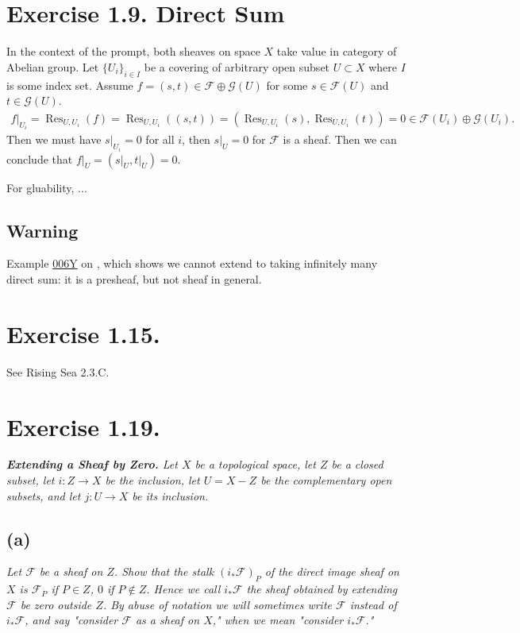 \section{Exercise 1.9. Direct Sum}\label{Hart Ex 1.9.}

In the context of the prompt, both sheaves on space $X$ take value in category of Abelian group. Let $\{U_i\}_{i\in I}$ be a covering of arbitrary open subset $U\subset X$ where $I$ is some index set. Assume $f=(s,t)\in \mathscr F\oplus\mathscr G(U)$ for some $s\in\mathscr F(U)$ and $t\in\mathscr G(U)$. 
\begin{align*}
    f\vert_{U_i}=\operatorname{Res}_{U,U_i}(f)=\operatorname{Res}_{U,U_i}((s,t))=(\operatorname{Res}_{U,U_i}(s),\operatorname{Res}_{U,U_i}(t))=0\in \mathscr F(U_i)\oplus\mathscr G(U_i).
\end{align*}
Then we must have $s\vert_{U_i}=0$ for all $i$, then $s\vert_U=0$ for $\mathscr F$ is a sheaf. Then we can conclude that $f\vert_{U}=(s\vert_U,t\vert_U)=0$.

For gluability, ...

\subsection{Warning}

Example \href{https://stacks.math.columbia.edu/tag/006Y}{006Y} on \cite{stacks-project}, which shows we cannot extend to taking infinitely many direct sum: it is a presheaf, but not sheaf in general. 

\section{Exercise 1.15.}

See Rising Sea 2.3.C.

\section{Exercise 1.19.}\label{Hart Chap 2 Ex 1.19.}

\textit{\textbf{Extending a Sheaf by Zero.} Let $X$ be a topological space, let $Z$ be a closed subset, let $i:Z\to X$ be the inclusion, let $U=X-Z$ be the complementary open subsets, and let $j:U\to X$ be its inclusion.}

\subsection{(a)}
\textit{Let $\mathscr F$ be a sheaf on $Z$. Show that the stalk $(i_{\ast}\mathscr F)_P$ of the direct image sheaf on $X$ is $\mathscr F_P$ if $P\in Z$, $0$ if $P\notin Z$. Hence we call $i_{\ast}\mathscr F$ the sheaf obtained by extending $\mathscr F$ be zero outside $Z$. By abuse of notation we will sometimes write $\mathscr F$ instead of $i_{\ast}\mathscr F$, and say "consider $\mathscr F$ as a sheaf on $X$," when we mean "consider $i_{\ast}\mathscr F$." }

